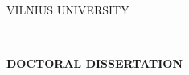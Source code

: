 
\thispagestyle{empty}                   %
{\selectfont
\linespread{1.15}\selectfont
\renewcommand\bfdefault{m}%


\begin{flushright}
    \thesisDOI \\
    \thesisORCID
\end{flushright}

\begin{center}
	\vspace*{5mm}	
	\begin{flushleft}
         \fontsize{12}{12}\selectfont
	       VILNIUS UNIVERSITY \\
	\end{flushleft}
 
	\vspace{50mm minus 45mm}
	\begin{flushleft}
	   {\fontsize{15}{15}\selectfont  \thesisAuthorName  \\ \MakeUppercase{\thesisAuthorSurname} \par}
    \end{flushleft}

	\vspace{10mm}
	\begin{flushleft}
    	{ \fontsize{21}{21}\selectfont
    	   \thesisTitleEN \par
    	}
    \end{flushleft}

    \vspace{50mm}
    \begin{flushleft}
        \renewcommand\bfdefault{b}
        \fontsize{12}{12}\selectfont
        {\bf DOCTORAL DISSERTATION}\\ 
    \end{flushleft}
    

\end{center}}

